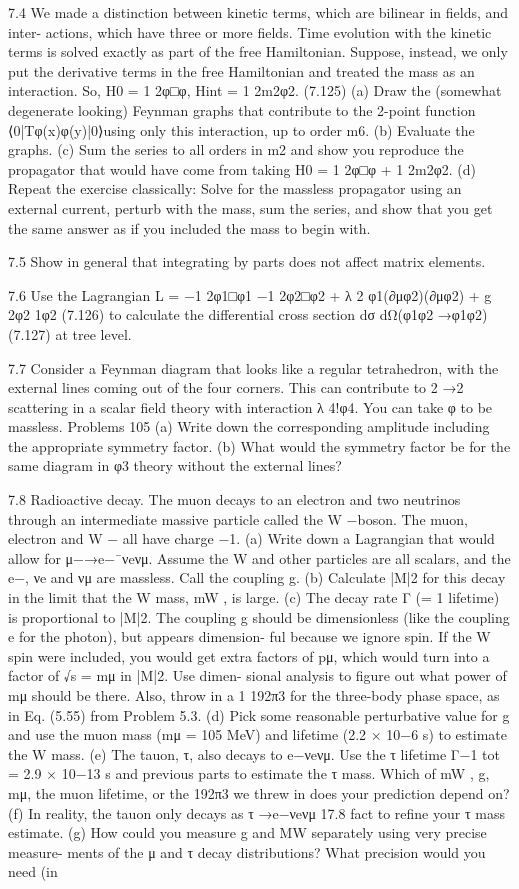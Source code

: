 7.4 We made a distinction between kinetic terms, which are bilinear in ﬁelds, and inter-
actions, which have three or more ﬁelds. Time evolution with the kinetic terms is
solved exactly as part of the free Hamiltonian. Suppose, instead, we only put the
derivative terms in the free Hamiltonian and treated the mass as an interaction. So,
H0 = 1
2φ□φ,
Hint = 1
2m2φ2.
(7.125)
(a) Draw the (somewhat degenerate looking) Feynman graphs that contribute to
the 2-point function ⟨0|T{φ(x)φ(y)}|0⟩using only this interaction, up to
order m6.
(b) Evaluate the graphs.
(c) Sum the series to all orders in m2 and show you reproduce the propagator that
would have come from taking H0 = 1
2φ□φ + 1
2m2φ2.
(d) Repeat the exercise classically: Solve for the massless propagator using an
external current, perturb with the mass, sum the series, and show that you get
the same answer as if you included the mass to begin with.

7.5 Show in general that integrating by parts does not affect matrix elements.

7.6 Use the Lagrangian
L = −1
2φ1□φ1 −1
2φ2□φ2 + λ
2 φ1(∂μφ2)(∂μφ2) + g
2φ2
1φ2
(7.126)
to calculate the differential cross section
dσ
dΩ(φ1φ2 →φ1φ2)
(7.127)
at tree level.

7.7 Consider a Feynman diagram that looks like a regular tetrahedron, with the external
lines coming out of the four corners. This can contribute to 2 →2 scattering in a
scalar ﬁeld theory with interaction λ
4!φ4. You can take φ to be massless.
Problems
105
(a) Write down the corresponding amplitude including the appropriate symmetry
factor.
(b) What would the symmetry factor be for the same diagram in φ3 theory without
the external lines?

7.8 Radioactive decay. The muon decays to an electron and two neutrinos through an
intermediate massive particle called the W −boson. The muon, electron and W −
all have charge −1.
(a) Write down a Lagrangian that would allow for μ−→e−¯νeνμ. Assume the W
and other particles are all scalars, and the e−, νe and νμ are massless. Call the
coupling g.
(b) Calculate |M|2 for this decay in the limit that the W mass, mW , is large.
(c) The decay rate Γ (=
1
lifetime) is proportional to |M|2. The coupling g should
be dimensionless (like the coupling e for the photon), but appears dimension-
ful because we ignore spin. If the W spin were included, you would get extra
factors of pμ, which would turn into a factor of √s = mμ in |M|2. Use dimen-
sional analysis to ﬁgure out what power of mμ should be there. Also, throw in
a
1
192π3 for the three-body phase space, as in Eq. (5.55) from Problem 5.3.
(d) Pick some reasonable perturbative value for g and use the muon mass
(mμ = 105 MeV) and lifetime (2.2 × 10−6 s) to estimate the W mass.
(e) The tauon, τ, also decays to e−νeνμ. Use the τ lifetime Γ−1
tot = 2.9 × 10−13 s
and previous parts to estimate the τ mass. Which of mW , g, mμ, the muon
lifetime, or the 192π3 we threw in does your prediction depend on?
(f) In reality, the tauon only decays as τ →e−νeνμ 17.8%
fact to reﬁne your τ mass estimate.
(g) How could you measure g and MW separately using very precise measure-
ments of the μ and τ decay distributions? What precision would you need
(in %

